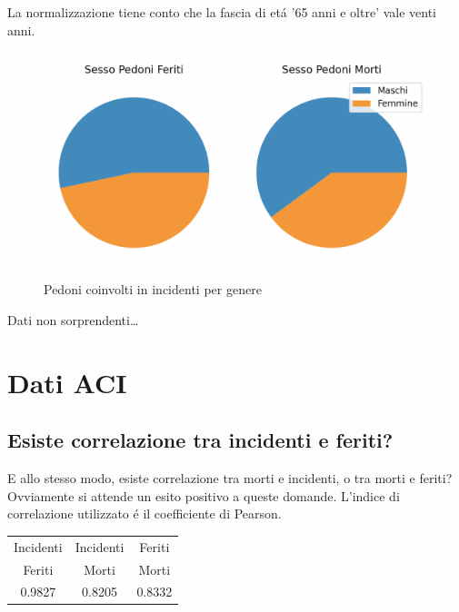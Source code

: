 \documentclass[a4paper]{report}
\begin{document}
La normalizzazione tiene conto che la fascia di et\'a '65 anni e oltre' vale venti anni.

\begin{figure}[!ht]
    \includegraphics[width=\linewidth]{../src/incidenti/incidenti_senza_coords/pedoni/sesso_morti_feriti.png}
    \caption{Pedoni coinvolti in incidenti per genere}
    \label{fig:sesso_morti_feriti}
\end{figure}

Dati non sorprendenti\dots





\newpage
\section{Dati ACI}

\newpage
\subsection{Esiste correlazione tra incidenti e feriti?}

E allo stesso modo, esiste correlazione tra morti e incidenti, o tra morti e feriti?\\
Ovviamente si attende un esito positivo a queste domande.
L'indice di correlazione utilizzato \'e il coefficiente di Pearson.
\begin{center}
    \begin{tabular}{ |c|c|c| } 
    \hline
    Incidenti & Incidenti & Feriti \\ 
    Feriti & Morti & Morti \\ 
    \hline
    0.9827 & 0.8205 & 0.8332 \\ 
    \hline
    \end{tabular}
\end{center}
\end{document}
